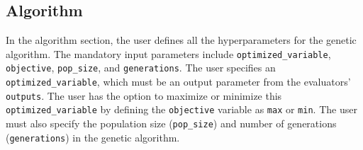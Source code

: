 \subsection{Algorithm}

In the algorithm section, the user defines all the hyperparameters for the 
genetic algorithm. 
The mandatory input parameters include \texttt{optimized\_variable}, 
\texttt{objective}, \texttt{pop\_size}, and \texttt{generations}.
The user specifies an \texttt{optimized\_variable}, which must be an output 
parameter from the evaluators' \texttt{outputs}. 
The user has the option to maximize or minimize this \texttt{optimized\_variable}
by defining the \texttt{objective} variable as \texttt{max} or \texttt{min}. 
The user must also specify the population size (\texttt{pop\_size}) and number 
of generations (\texttt{generations}) in the genetic algorithm. 

